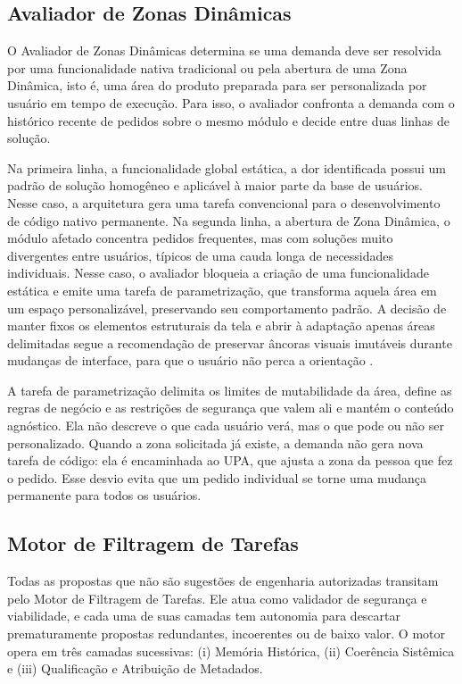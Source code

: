 \subsection{Avaliador de Zonas Dinâmicas}\label{sec:4.3.3}

O Avaliador de Zonas Dinâmicas determina se uma demanda deve ser resolvida por uma funcionalidade nativa tradicional ou pela abertura de uma Zona Dinâmica, isto é, uma área do produto preparada para ser personalizada por usuário em tempo de execução. Para isso, o avaliador confronta a demanda com o histórico recente de pedidos sobre o mesmo módulo e decide entre duas linhas de solução.

Na primeira linha, a funcionalidade global estática, a dor identificada possui um padrão de solução homogêneo e aplicável à maior parte da base de usuários. Nesse caso, a arquitetura gera uma tarefa convencional para o desenvolvimento de código nativo permanente. Na segunda linha, a abertura de Zona Dinâmica, o módulo afetado concentra pedidos frequentes, mas com soluções muito divergentes entre usuários, típicos de uma cauda longa de necessidades individuais. Nesse caso, o avaliador bloqueia a criação de uma funcionalidade estática e emite uma tarefa de parametrização, que transforma aquela área em um espaço personalizável, preservando seu comportamento padrão. A decisão de manter fixos os elementos estruturais da tela e abrir à adaptação apenas áreas delimitadas segue a recomendação de preservar âncoras visuais imutáveis durante mudanças de interface, para que o usuário não perca a orientação \cite{arora2025selfevolving}.

A tarefa de parametrização delimita os limites de mutabilidade da área, define as regras de negócio e as restrições de segurança que valem ali e mantém o conteúdo agnóstico. Ela não descreve o que cada usuário verá, mas o que pode ou não ser personalizado. Quando a zona solicitada já existe, a demanda não gera nova tarefa de código: ela é encaminhada ao UPA, que ajusta a zona da pessoa que fez o pedido. Esse desvio evita que um pedido individual se torne uma mudança permanente para todos os usuários.

\subsection{Motor de Filtragem de Tarefas}\label{sec:4.3.4}

Todas as propostas que não são sugestões de engenharia autorizadas transitam pelo Motor de Filtragem de Tarefas. Ele atua como validador de segurança e viabilidade, e cada uma de suas camadas tem autonomia para descartar prematuramente propostas redundantes, incoerentes ou de baixo valor. O motor opera em três camadas sucessivas: (i) Memória Histórica, (ii) Coerência Sistêmica e (iii) Qualificação e Atribuição de Metadados.

